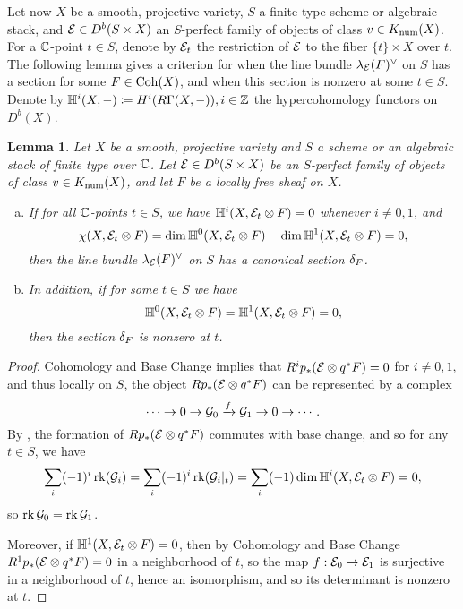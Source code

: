 \documentclass[letterpaper,12pt]{amsart}
\newtheorem{lem}[thm]{Lemma}
\theoremstyle{remark}
\begin{document}
Let now $X$ be a smooth, projective variety, $S$ a finite type scheme or algebraic stack, and $\mathcal{E} \in D^b(S \times X)$ an $S$-perfect family of objects of class $v \in K_{\mathrm{num}}(X)$. For a $\mathbb{C}$-point $t \in S$, denote by $\mathcal{E}_t$ the restriction of $\mathcal{E}$ to the fiber $\{t\} \times X$ over $t$. The following lemma gives a criterion for when the line bundle $\lambda_{\mathcal{E}}(F)^\vee$ on $S$ has a section for some $F \in \mathrm{Coh}(X)$, and when this section is nonzero at some $t \in S$. Denote by $\mathbb{H}^i(X, -) \coloneqq H^i(R\Gamma(X, -)), i \in \mathbb{Z}$ the hypercohomology functors on $D^b(X)$.
\begin{lem}\label{detsection}
    Let $X$ be a smooth, projective variety and $S$ a scheme or an algebraic stack of finite type over $\mathbb{C}$. Let $\mathcal{E} \in D^b(S \times X)$ be an $S$-perfect family of objects of class $v \in K_{\mathrm{num}}(X)$, and let $F$ be a locally free sheaf on $X$.
    \begin{enumerate}[(a)]
        \item If for all $\mathbb{C}$-points $t \in S$, we have $\mathbb{H}^i(X, \mathcal{E}_t \otimes F) = 0$ whenever $i \neq 0, 1$, and 
        \[ \chi(X, \mathcal{E}_t \otimes F) = \dim \mathbb{H}^0(X, \mathcal{E}_t \otimes F) - \dim \mathbb{H}^1(X, \mathcal{E}_t \otimes F) = 0, \]
        then the line bundle $\lambda_{\mathcal{E}}(F)^\vee$ on $S$ has a canonical section $\delta_F$.
        \item In addition, if for some $t \in S$ we have 
        \[ \mathbb{H}^0(X, \mathcal{E}_t \otimes F) = \mathbb{H}^1(X, \mathcal{E}_t \otimes F) = 0, \]
        then the section $\delta_F$ is nonzero at $t$.
    \end{enumerate}
\end{lem}
\begin{proof}
    Cohomology and Base Change implies that $R^i p_*(\mathcal{E} \otimes q^* F) = 0$ for $i \neq 0,1$, and thus locally on $S$, the object $R p_*(\mathcal{E} \otimes q^*F)$ can be represented by a complex
    \[ \cdots \to 0 \to \mathcal{G}_0 \xrightarrow{f} \mathcal{G}_1 \to 0 \to \cdots. \]
    By \cite[\href{https://stacks.math.columbia.edu/tag/0B91}{Tag 0B91}]{stacks-project}, the formation of $R p_*(\mathcal{E} \otimes q^*F)$ commutes with base change, and so for any $t \in S$, we have 
    \[ \sum_i (-1)^i \operatorname{\mathrm{rk}}(\mathcal{G}_i) = \sum_i (-1)^i \operatorname{\mathrm{rk}}(\mathcal{G}_i|_t) = \sum_i (-1) \dim \mathbb{H}^i(X, \mathcal{E}_t \otimes F) = 0, \]
    so $\operatorname{\mathrm{rk}} \mathcal{G}_0 = \operatorname{\mathrm{rk}} \mathcal{G}_1$.
    
    Moreover, if $\mathbb{H}^1(X, \mathcal{E}_t \otimes F) = 0$, then by Cohomology and Base Change $R^1 p_*(\mathcal{E} \otimes q^*F) = 0$ in a neighborhood of $t$, so the map $f: \mathcal{E}_0 \to \mathcal{E}_1$ is surjective in a neighborhood of $t$, hence an isomorphism, and so its determinant is nonzero at $t$.
\end{proof}
\end{document}
